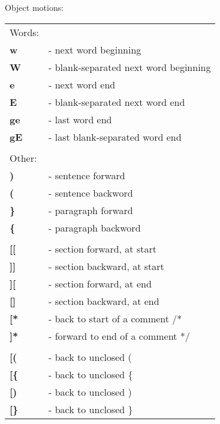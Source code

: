 \documentclass[a4paper,8pt]{extarticle}
\begin{document}
\begin{multicols*}{4}
		\noindent
		Object motions:\\
		\begin{tabular}{ l l }
			Words:				&													\\
			\textbf{w}			&	- next word beginning 								\\
			\textbf{W}			&	- blank-separated next word beginning					\\
			\textbf{e}			&	- next word end 									\\
			\textbf{E}			&	- blank-separated next word end 						\\
			\textbf{ge}			&	- last word end 									\\
			\textbf{gE}			&	- last blank-separated word end 						\\
								&													\\
			Other:				&													\\
			\textbf{)}			&	- sentence forward 									\\
			\textbf{(}			&	- sentence backword									\\
			\textbf{\}}			&	- paragraph forward									\\
			\textbf{\{}			&	- paragraph backword								\\
								&													\\
			\textbf{[[}			&	- section forward, at start							\\
			\textbf{]]}			&	- section backward, at start							\\
			\textbf{][}			&	- section forward, at end							\\
			\textbf{[]}			&	- section backward, at end							\\
			\textbf{[*}			&	- back to start of a comment /*						\\
			\textbf{]*}			&	- forward to end of a comment */						\\
								&													\\
			\textbf{[(}			&	- back to unclosed (								\\
			\textbf{[\{}			&	- back to unclosed \{								\\
			\textbf{[)}			&	- back to unclosed )								\\
			\textbf{[\}}			&	- back to unclosed \}								\\
		\end{tabular}\\


\end{multicols*}
\end{document}
